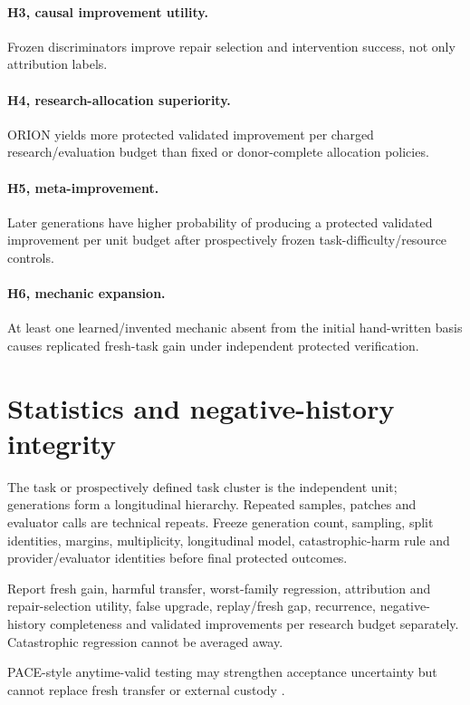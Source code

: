 \documentclass[11pt]{article}
\begin{document}
\paragraph{H3, causal improvement utility.} Frozen discriminators improve repair selection and intervention success, not only attribution labels.

\paragraph{H4, research-allocation superiority.} ORION yields more protected validated improvement per charged research/evaluation budget than fixed or donor-complete allocation policies.

\paragraph{H5, meta-improvement.} Later generations have higher probability of producing a protected validated improvement per unit budget after prospectively frozen task-difficulty/resource controls.

\paragraph{H6, mechanic expansion.} At least one learned/invented mechanic absent from the initial hand-written basis causes replicated fresh-task gain under independent protected verification.

\section{Statistics and negative-history integrity}
The task or prospectively defined task cluster is the independent unit; generations form a longitudinal hierarchy. Repeated samples, patches and evaluator calls are technical repeats. Freeze generation count, sampling, split identities, margins, multiplicity, longitudinal model, catastrophic-harm rule and provider/evaluator identities before final protected outcomes.

Report fresh gain, harmful transfer, worst-family regression, attribution and repair-selection utility, false upgrade, replay/fresh gap, recurrence, negative-history completeness and validated improvements per research budget separately. Catastrophic regression cannot be averaged away.

PACE-style anytime-valid testing may strengthen acceptance uncertainty but cannot replace fresh transfer or external custody \cite{pace2026}.
\end{document}
